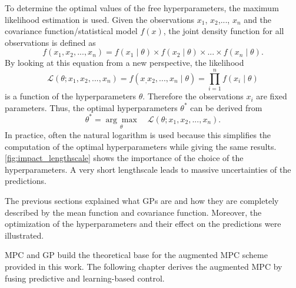 To determine the optimal values of the free hyperparameters, the maximum likelihood estimation is used. Given the observations $x_1$, $x_2$,..., $x_n$ and the covariance function/statistical model $f(x)$, the joint density function for all observations is defined as
\begin{equation}\label{eq:jointdensity}
f(x_1,x_2,...,x_n)=f(x_1\mid\theta)\times f(x_2\mid\theta)\times...\times f(x_n\mid\theta).
\end{equation}
By looking at this equation from a new perspective, the likelihood
\begin{equation}\label{eq:likelihood}
\mathcal{L}(\theta;x_1,x_2,...,x_n)=f(x_,x_2,...,x_n\mid\theta)=\prod_{i=1}^nf(x_i\mid\theta)
\end{equation}
is a function of the hyperparameters $\theta$.
Therefore the observations $x_i$ are fixed parameters.
Thus, the optimal hyperparameters $\theta^*$ can be derived from  
\begin{equation}\label{eq:loglikelihood}
\theta^* = \underset{\theta}{\arg\max} \quad \mathcal{L}(\theta;x_1,x_2,...,x_n).
\end{equation}
In practice, often the natural logarithm is used because this simplifies the computation of the optimal hyperparameters while giving the same results.
\cref{fig:impact_lengthscale} shows the importance of the choice of the hyperparameters. A very short lengthscale leads to massive uncertainties of the predictions.\par\medskip

The previous sections explained what GPs are and how they are completely described by the mean function and covariance function.
Moreover, the optimization of the hyperparameters and their effect on the predictions were illustrated.

MPC and GP build the theoretical base for the augmented MPC scheme provided in this work.
The following chapter derives the augmented MPC by fusing predictive and learning-based control.